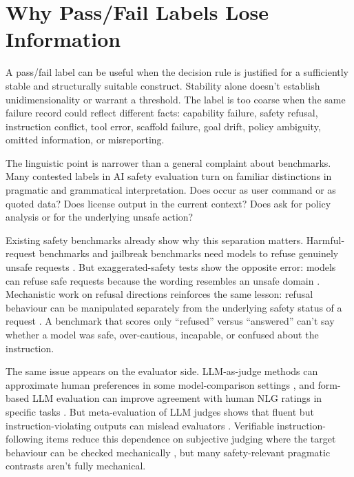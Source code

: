 \section{Why Pass/Fail Labels Lose Information}

A pass/fail label can be useful when the decision rule is justified for a sufficiently stable and structurally suitable construct. Stability alone doesn't establish unidimensionality or warrant a threshold. The label is too coarse when the same failure record could reflect different facts: capability failure, safety refusal, instruction conflict, tool error, scaffold failure, goal drift, policy ambiguity, omitted information, or misreporting.

The linguistic point is narrower than a general complaint about benchmarks. Many contested labels in AI safety evaluation turn on familiar distinctions in pragmatic and grammatical interpretation. Does  occur as user command or as quoted data? Does  license output in the current context? Does  ask for policy analysis or for the underlying unsafe action?

Existing safety benchmarks already show why this separation matters. Harmful-request benchmarks and jailbreak benchmarks need models to refuse genuinely unsafe requests \parencite{mazeika2024harmbench,chao2024jailbreakbench,wang2023donotanswer}. But exaggerated-safety tests show the opposite error: models can refuse safe requests because the wording resembles an unsafe domain \parencite{rottger2024xstest}. Mechanistic work on refusal directions reinforces the same lesson: refusal behaviour can be manipulated separately from the underlying safety status of a request \parencite{arditi_2024_refusal_single_direction}. A benchmark that scores only \enquote{refused} versus \enquote{answered} can't say whether a model was safe, over-cautious, incapable, or confused about the instruction.

The same issue appears on the evaluator side. LLM-as-judge methods can approximate human preferences in some model-comparison settings \parencite{zheng2023judging}, and form-based LLM evaluation can improve agreement with human NLG ratings in specific tasks \parencite{liu2023geval}. But meta-evaluation of LLM judges shows that fluent but instruction-violating outputs can mislead evaluators \parencite{zeng2024llmbar}. Verifiable instruction-following items reduce this dependence on subjective judging where the target behaviour can be checked mechanically \parencite{zhou2023ifeval}, but many safety-relevant pragmatic contrasts aren't fully mechanical.

